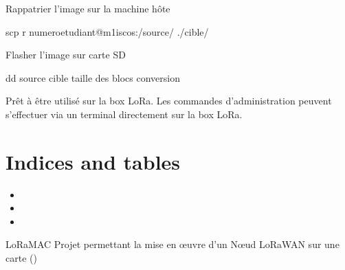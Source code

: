 \documentclass[letterpaper,10pt,french]{sphinxmanual}
\begin{document}
Rappatrier l’image sur la machine hôte

\begin{sphinxVerbatim}[commandchars=\\\{\}]
scp \PYGZhy{}r numeroetudiant@m1\PYGZhy{}isc\PYGZhy{}os:/\PYGZlt{}source\PYGZgt{}/ ./\PYGZlt{}cible\PYGZgt{}/
\end{sphinxVerbatim}

Flasher l’image sur carte SD

\begin{sphinxVerbatim}[commandchars=\\\{\}]
dd \PYGZlt{}source\PYGZgt{} \PYGZlt{}cible\PYGZgt{} \PYGZlt{}taille des blocs\PYGZgt{}   \PYGZlt{}conversion\PYGZgt{}
\end{sphinxVerbatim}

Prêt à être utilisé sur la box LoRa. Les commandes d’administration peuvent s’effectuer via un terminal directement sur la box LoRa.


\chapter{Indices and tables}
\label{\detokenize{index:indices-and-tables}}\begin{itemize}
\item {} 

\item {} 

\item {} 

\end{itemize}

\begin{sphinxthebibliography}{LoRaMAC\sphinxhyphen{}}
Projet permettant la mise en œuvre d’un Nœud LoRaWAN sur une carte  ()
\end{sphinxthebibliography}



\renewcommand{\indexname}{Index}
\printindex
\end{document}
